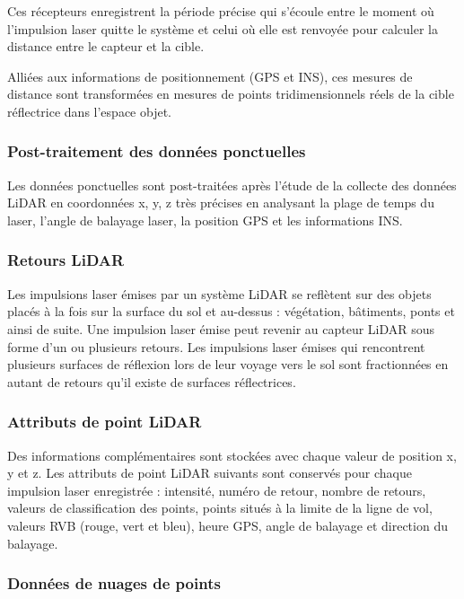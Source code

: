 Ces récepteurs enregistrent la période précise qui s'écoule entre le moment où l'impulsion laser quitte le système et celui où elle est renvoyée pour calculer la distance entre le capteur et la cible.

Alliées aux informations de positionnement (GPS et INS), ces mesures de distance sont transformées en mesures de points tridimensionnels réels de la cible réflectrice dans l'espace objet.

\subsubsection{Post-traitement des données ponctuelles}

Les données ponctuelles sont post-traitées après l'étude de la collecte des données LiDAR en coordonnées x, y, z très précises en analysant la plage de temps du laser, l'angle de balayage laser, la position GPS et les informations INS.

\subsubsection{Retours LiDAR}

Les impulsions laser émises par un système LiDAR se reflètent sur des objets placés à la fois sur la surface du sol et au-dessus : végétation, bâtiments, ponts et ainsi de suite. Une impulsion laser émise peut revenir au capteur LiDAR sous forme d'un ou plusieurs retours. Les impulsions laser émises qui rencontrent plusieurs surfaces de réflexion lors de leur voyage vers le sol sont fractionnées en autant de retours qu'il existe de surfaces réflectrices.

\subsubsection{Attributs de point LiDAR}

Des informations complémentaires sont stockées avec chaque valeur de position x, y et z. Les attributs de point LiDAR suivants sont conservés pour chaque impulsion laser enregistrée : intensité, numéro de retour, nombre de retours, valeurs de classification des points, points situés à la limite de la ligne de vol, valeurs RVB (rouge, vert et bleu), heure GPS, angle de balayage et direction du balayage.

\subsubsection{Données de nuages de points}

